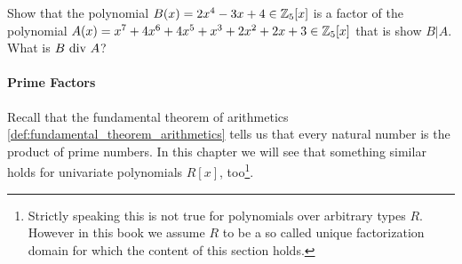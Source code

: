 \begin{exercise}
Show that the polynomial $B(x)= 2x^4-3x+4\in \mathbb{Z}_5[x]$ is a factor of the polynomial $A(x)=x^7 + 4x^6 + 4x^5 + x^3 + 2x^2 + 2x + 3\in\mathbb{Z}_5[x]$ that is show $B|A$. What is $B \text{ div } A$?
\end{exercise}
\paragraph{Prime Factors} Recall that the fundamental theorem of arithmetics \ref{def:fundamental_theorem_arithmetics} tells us that every natural number is the product of prime numbers. In this chapter we will see that something similar holds for univariate polynomials $R[x]$, too\footnote{Strictly speaking this is not true for polynomials over arbitrary types $R$. However in this book we assume $R$ to be a so called unique factorization domain for which the content of this section holds.}. 

